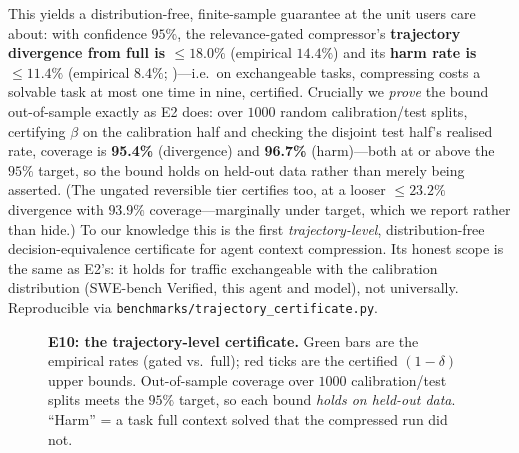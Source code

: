 \documentclass{article}
\begin{document}
This yields a distribution-free, finite-sample guarantee at the unit users care about: with
confidence $95\%$, the relevance-gated compressor's \textbf{trajectory divergence from full
is $\le 18.0\%$} (empirical $14.4\%$) and its \textbf{harm rate is $\le 11.4\%$} (empirical
$8.4\%$; )---i.e.\ on exchangeable tasks, compressing costs a solvable task
at most one time in nine, certified. Crucially we \emph{prove} the bound out-of-sample exactly as E2 does: over
$1000$ random calibration/test splits, certifying $\beta$ on the calibration half and
checking the disjoint test half's realised rate, coverage is \textbf{95.4\%} (divergence)
and \textbf{96.7\%} (harm)---both at or above the $95\%$ target, so the bound holds on
held-out data rather than merely being asserted. (The ungated reversible tier certifies
too, at a looser $\le 23.2\%$ divergence with $93.9\%$ coverage---marginally under target,
which we report rather than hide.) To our knowledge this is the first \emph{trajectory-level},
distribution-free decision-equivalence certificate for agent context compression. Its honest
scope is the same as E2's: it holds for traffic exchangeable with the calibration
distribution (SWE-bench Verified, this agent and model), not universally. Reproducible via
\texttt{benchmarks/trajectory\_certificate.py}.

\begin{figure}[t]
\centering
{}
\caption{\textbf{E10: the trajectory-level certificate.} \textcolor{distilgreen}{Green bars}
are the empirical rates (gated vs.\ full); \textcolor{distilred}{red ticks} are the certified
$(1{-}\delta)$ upper bounds. Out-of-sample coverage over $1000$ calibration/test splits meets
the $95\%$ target, so each bound \emph{holds on held-out data}. ``Harm'' = a task full context
solved that the compressed run did not.}
\label{fig:e10cert}
\end{figure}
\end{document}
